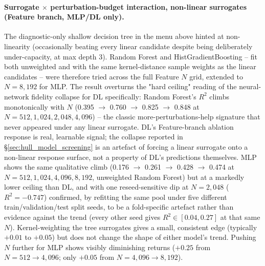 \paragraph{Surrogate $\times$ perturbation-budget interaction, non-linear
surrogates (Feature branch, MLP/DL only).} The diagnostic-only shallow
decision tree in the menu above hinted at non-linearity (occasionally
beating every linear candidate despite being deliberately under-capacity, at
max depth 3). Random Forest and HistGradientBoosting -- fit both unweighted
and with the same kernel-distance sample weights as the linear
candidates -- were therefore tried across the full Feature $N$ grid,
extended to $N=8{,}192$ for MLP. The result overturns the "hard ceiling"
reading of the neural-network fidelity collapse for DL specifically: Random
Forest's $R^2$ climbs monotonically with $N$ (0.395 $\to$ 0.760 $\to$ 0.825
$\to$ 0.848 at $N=512,1{,}024,2{,}048,4{,}096$) -- the classic
more-perturbations-help signature that never appeared under any linear
surrogate. DL's Feature-branch ablation response is real, learnable signal;
the collapse reported in \S\ref{sec:hull_model_screening} is an artefact of
forcing a linear surrogate onto a non-linear response surface, not a
property of DL's predictions themselves. MLP shows the same qualitative
climb (0.176 $\to$ 0.261 $\to$ 0.428 $\to$ 0.474 at $N=512,1{,}024,4{,}096,
8{,}192$, unweighted Random Forest) but at a markedly lower ceiling than DL,
and with one reseed-sensitive dip at $N=2{,}048$ ($R^2=-0.747$) confirmed, by
refitting the same pool under five different train/validation/test split
seeds, to be a fold-specific artefact rather than evidence against the
trend (every other seed gives $R^2\in[0.04,0.27]$ at that same $N$).
Kernel-weighting the tree surrogates gives a small, consistent edge
(typically $+0.01$ to $+0.05$) but does not change the shape of either
model's trend. Pushing $N$ further for MLP shows visibly diminishing
returns ($+0.25$ from $N{=}512\to4{,}096$; only $+0.05$ from
$N{=}4{,}096\to8{,}192$).

